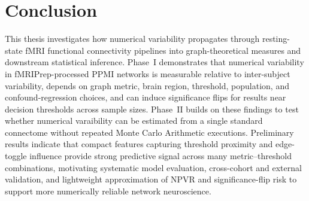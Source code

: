 \chapter{Conclusion}
\label{chap:conclusion}
This thesis investigates how numerical variability propagates through resting-state fMRI functional connectivity pipelines into graph-theoretical measures and downstream statistical inference. Phase~I demonstrates that numerical variability in fMRIPrep-processed PPMI networks is measurable relative to inter-subject variability, depends on graph metric, brain region, threshold, population, and confound-regression choices, and can induce significance flips for results near decision thresholds across sample sizes. Phase~II builds on these findings to test whether numerical varaibility can be estimated from a single standard connectome without repeated Monte Carlo Arithmetic executions. Preliminary results indicate that compact features capturing threshold proximity and edge-toggle influence provide strong predictive signal across many metric--threshold combinations, motivating systematic model evaluation, cross-cohort and external validation, and lightweight approximation of NPVR and significance-flip risk to support more numerically reliable network neuroscience.